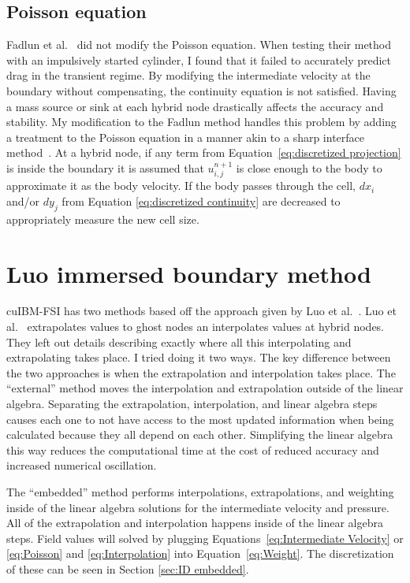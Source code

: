 \subsection{Poisson equation}
\label{sec:ID fadlun poisson}
Fadlun et al.~\cite{Fadlun:2000fl} did not modify the Poisson equation. 
When testing their method with an impulsively started cylinder, I found that it failed to accurately predict drag in the transient regime. 
By modifying the intermediate velocity at the boundary without compensating, the continuity equation is not satisfied. 
Having a mass source or sink at each hybrid node drastically affects the accuracy and stability. 
My modification to the Fadlun method handles this problem by adding a treatment to the Poisson equation in a manner akin to a sharp interface method~\cite{Sotiropoulos:2014gv}. 
At a hybrid node, if any term from Equation~\eqref{eq:discretized projection} is inside the boundary it is assumed that $u_{i,j}^{n+1}$ is close enough to the body to approximate it as the body velocity. 
If the body passes through the cell, $dx_i$ and/or $dy_j$ from Equation \eqref{eq:discretized continuity} are decreased to appropriately measure the new cell size. 

\section{Luo immersed boundary method}
\label{sec:ID luo}
cuIBM-FSI has two methods based off the approach given by Luo et al.~\cite{Luo:2012gx}. 
Luo et al.~\cite{Luo:2012gx} extrapolates values to ghost nodes an interpolates values at hybrid nodes.
They left out details describing exactly where all this interpolating and extrapolating takes place. 
I tried doing it two ways. 
The key difference between the two approaches is when the extrapolation and interpolation takes place. 
The ``external'' method moves the interpolation and extrapolation outside of the linear algebra. 
Separating the extrapolation, interpolation, and linear algebra steps causes each one to not have access to the most updated information when being calculated because they all depend on each other. 
Simplifying the linear algebra this way reduces the computational time at the cost of reduced accuracy and increased numerical oscillation. 

The ``embedded'' method performs  interpolations, extrapolations, and weighting inside of the linear algebra solutions for the intermediate velocity and pressure. 
All of the extrapolation and interpolation happens inside of the linear algebra steps.
Field values will solved by plugging Equations~\eqref{eq:Intermediate Velocity} or \eqref{eq:Poisson} and \eqref{eq:Interpolation} into Equation~\eqref{eq:Weight}. 
The discretization of these can be seen in Section \ref{sec:ID embedded}. 

